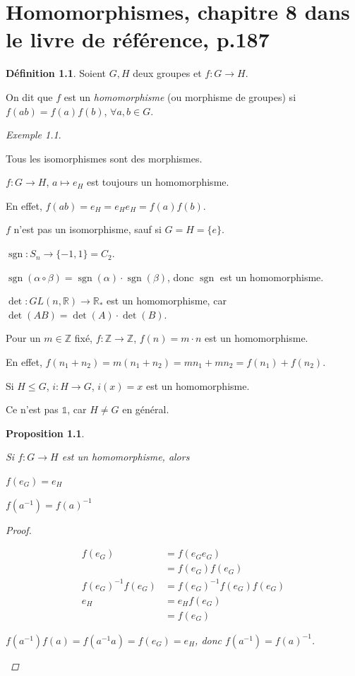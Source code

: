 \documentclass{report}
\newcommand*{\lte}{\leqslant}
\newcommand*{\reels}{\mathbb{R}}
\newcommand*{\entiers}{\mathbb{Z}}
\newcommand*{\identite}{\mathds{1}}
\newcommand*{\signe}{\operatorname{sgn}}
\newtheorem*{prop}{Proposition}
\theoremstyle{definition}
\newtheorem*{defin}{D\'efinition}
\theoremstyle{remark}
\newtheorem*{exem}{Exemple}
\begin{document}
	\chapter[Homomorphismes]{Homomorphismes, chapitre 8 dans le livre de r\'ef\'erence, p.187}
	\begin{defin}
		Soient $G,H$ deux groupes et $f:G \to H$.

		On dit que $f$ est un \emph{homomorphisme} (ou morphisme de groupes) si $f(ab) = f(a)f(b)$, $\forall a,b \in G$.
	\end{defin}
	\begin{exem}~

		\begin{nlist}
			\item Tous les isomorphismes sont des morphismes.
			\item $f:G \to H$, $a \mapsto e_H$ est toujours un homomorphisme.

			En effet, $f(ab) = e_H = e_H e_H = f(a) f(b)$.

			$f$ n'est pas un isomorphisme, sauf si $G=H=\{e\}$.
			\item $\signe:S_n \to \{-1,1\} = C_2$.

			$\signe(\alpha \circ \beta) = \signe(\alpha) \cdot \signe(\beta)$, donc $\signe$ est un homomorphisme.
			\item $\det:GL(n, \reels) \to \reels_*$ est un homomorphisme, car $\det(AB) = \det(A) \cdot \det(B)$.
			\item Pour un $m \in \entiers$ fix\'e, $f:\entiers \to \entiers$, $f(n) = m \cdot n$ est un homomorphisme.

			En effet, $f(n_1+n_2) = m(n_1+n_2) = mn_1 + mn_2 = f(n_1) + f(n_2)$.
			\item Si $H \lte G$, $i:H \to G$, $i(x)=x$ est un homomorphisme.

			Ce n'est pas $\identite$, car $H \neq G$ en g\'en\'eral.
		\end{nlist}
	\end{exem}
	\begin{prop}~

		Si $f:G \to H$ est un homomorphisme, alors
		\begin{nlist}
			\item $f(e_G) = e_H$
			\item $f(a^{-1}) = f(a)^{-1}$
		\end{nlist}
		\begin{proof}~

			\begin{nlist}
				\item
				\begin{align*}
					f(e_G)&= f(e_G e_G)\\
					&= f(e_G) f(e_G)\\
					f(e_G)^{-1}f(e_G)&= f(e_G)^{-1} f(e_G) f(e_G)\\
					e_H&= e_H f(e_G)\\
					&= f(e_G)
				\end{align*}
				\item $f(a^{-1}) f(a) = f(a^{-1}a) = f(e_G) = e_H$, donc $f(a^{-1}) = f(a)^{-1}$.
			\end{nlist}
		\end{proof}
	\end{prop}
\end{document}
